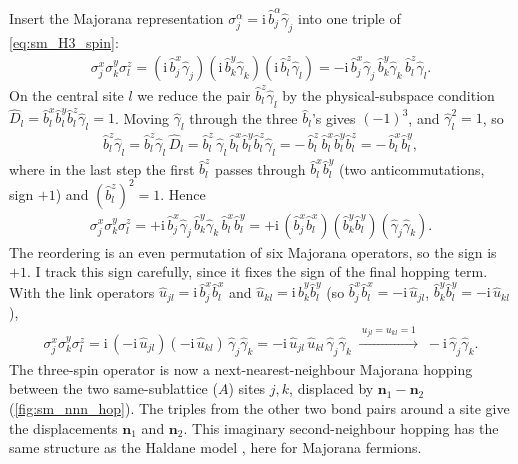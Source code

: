 \documentclass[
  aps,
  prl,
  preprint,
  amsmath,
  amssymb,
  superscriptaddress,
  floatfix
]{revtex4-2}
\newcommand{\ii}{\mathrm{i}}
\newcommand{\oga}{\hat \gamma}
\newcommand{\obx}{\hat b^x}
\newcommand{\oby}{\hat b^y}
\newcommand{\obz}{\hat b^z}
\begin{document}
Insert the Majorana representation $\sigma^\alpha_j = \ii\,\hat
b^\alpha_j\oga_j$ into one triple of \cref{eq:sm_H3_spin}:
\begin{align}
  \sigma_j^x \sigma_k^y \sigma_l^z
  = (\ii\, \obx_j \oga_j)(\ii\, \oby_k \oga_k)(\ii\, \obz_l \oga_l)
  = -\ii\, \obx_j \oga_j\, \oby_k \oga_k\, \obz_l \oga_l .
\end{align}
On the central site $l$ we reduce the pair $\obz_l\oga_l$ by the
physical-subspace condition $\hat D_l=\obx_l\oby_l\obz_l\oga_l=1$. Moving
$\oga_l$ through the three $\hat b_l$'s gives $(-1)^3$, and $\oga_l^2=1$,
so
\begin{align}
  \obz_l \oga_l = \obz_l \oga_l\, \hat D_l
  = \obz_l\, \oga_l\, \obx_l \oby_l \obz_l \oga_l
  = -\,\obz_l\, \obx_l \oby_l \obz_l
  = -\,\obx_l \oby_l ,
\end{align}
where in the last step the first $\obz_l$ passes through $\obx_l\oby_l$ (two
anticommutations, sign $+1$) and $(\obz_l)^2=1$. Hence
\begin{align}
  \sigma_j^x \sigma_k^y \sigma_l^z
  = +\ii\, \obx_j \oga_j\, \oby_k \oga_k\, \obx_l \oby_l
  = +\ii\, (\obx_j \obx_l)(\oby_k \oby_l)(\oga_j \oga_k).
\end{align}
The reordering is an even permutation of six Majorana
operators, so the sign is $+1$. I track this sign carefully, since it fixes
the sign of the final hopping term. With the link operators $\hat u_{jl}=\ii\,\obx_j
\obx_l$ and $\hat u_{kl}=\ii\,\oby_k \oby_l$ (so $\obx_j\obx_l = -\ii\,\hat
u_{jl}$, $\oby_k\oby_l=-\ii\,\hat u_{kl}$),
\begin{align}
  \sigma_j^x \sigma_k^y \sigma_l^z
  = \ii\,(-\ii\,\hat u_{jl})(-\ii\,\hat u_{kl})\,\oga_j\oga_k
  = -\ii\, \hat u_{jl}\, \hat u_{kl}\, \oga_j \oga_k
  \;\xrightarrow{\ u_{jl}=u_{kl}=1\ }\;
  -\ii\, \oga_j \oga_k .
  \label{eq:sm_H3_triple}
\end{align}
The three-spin operator is now a next-nearest-neighbour Majorana
hopping between the two same-sublattice ($A$) sites $j,k$, displaced by
$\bm n_1-\bm n_2$ (\cref{fig:sm_nnn_hop}). The triples from the
other two bond pairs around a site give the displacements $\bm n_1$ and
$\bm n_2$. This imaginary second-neighbour hopping has the same
structure as the Haldane model \cite{Haldane1988}, here for Majorana
fermions.
\end{document}
